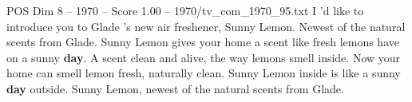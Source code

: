 \begin{textsample}{POS Dim 8 – 1970 – Score 1.00 – 1970/tv\_com\_1970\_95.txt}  \label{ex:f8_pos_084}
I 'd like to introduce you to Glade 's new air freshener, Sunny Lemon.
Newest of the natural scents from Glade.
Sunny Lemon gives your home a scent like fresh lemons have on a sunny \textbf{day}.
A scent clean and alive, the way lemons smell inside.
Now your home can smell lemon fresh, naturally clean.
Sunny Lemon inside is like a sunny \textbf{day} outside.
Sunny Lemon, newest of the natural scents from Glade.

\end{textsample}
